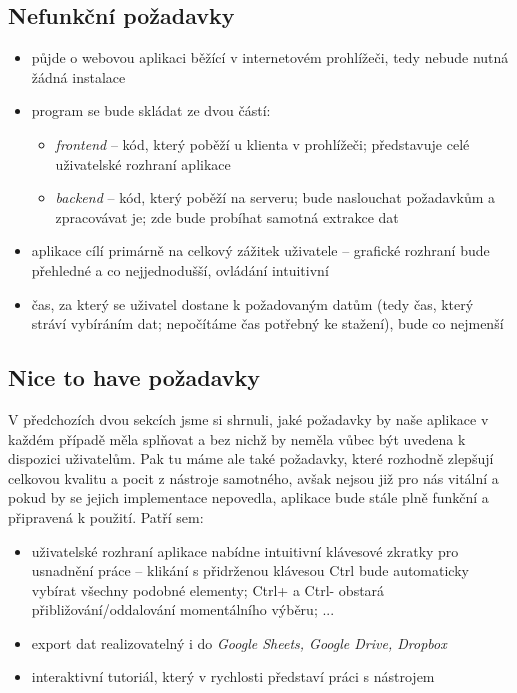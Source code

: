 \documentclass[thesis=B,czech]{FITthesis}[2012/06/26]
\begin{document}
\subsection{Nefunkční požadavky}
\begin{itemize}
	\item půjde o webovou aplikaci běžící v internetovém prohlížeči, tedy nebude nutná žádná instalace
	\item program se bude skládat ze dvou částí:
	\begin{itemize}
		\item \emph{frontend} -- kód, který poběží u klienta v prohlížeči; představuje celé uživatelské rozhraní aplikace
		\item \emph{backend} -- kód, který poběží na serveru; bude naslouchat požadavkům a zpracovávat je; zde bude probíhat samotná extrakce dat
	\end{itemize}
	\item aplikace cílí primárně na celkový zážitek uživatele -- grafické rozhraní bude přehledné a co nejjednodušší, ovládání intuitivní
	\item čas, za který se uživatel dostane k požadovaným datům (tedy čas, který stráví vybíráním dat; nepočítáme čas potřebný ke stažení), bude co nejmenší
\end{itemize}

\subsection{Nice to have požadavky}
V předchozích dvou sekcích jsme si shrnuli, jaké požadavky by naše aplikace v každém případě měla splňovat a bez nichž by neměla vůbec být uvedena k dispozici uživatelům. Pak tu máme ale také požadavky, které rozhodně zlepšují celkovou kvalitu a pocit z nástroje samotného, avšak nejsou již pro nás vitální a pokud by se jejich implementace nepovedla, aplikace bude stále plně funkční a připravená k použití. Patří sem:
\begin{itemize}
	\item uživatelské rozhraní aplikace nabídne intuitivní klávesové zkratky pro usnadnění práce -- klikání s přidrženou klávesou \textsf{Ctrl} bude automaticky vybírat všechny podobné elementy; \textsf{Ctrl+} a \textsf{Ctrl-} obstará přibližování/oddalování momentálního výběru; ...
	\item export dat realizovatelný i do \emph{Google Sheets, Google Drive, Dropbox}
	\item interaktivní tutoriál, který v rychlosti představí práci s nástrojem
\end{itemize}
\end{document}

